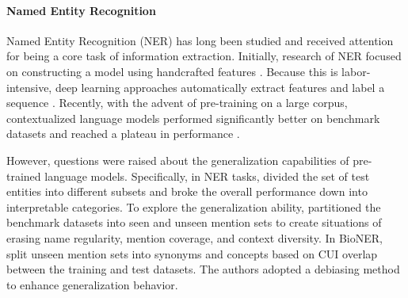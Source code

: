 \documentclass[11pt]{article}
\begin{document}
\paragraph{Named Entity Recognition} Named Entity Recognition (NER) has long been studied and received attention for being a core task of information extraction.
Initially, research of NER focused on constructing a model using handcrafted features \cite{zhou2002named,bender2003maximum,settles2004biomedical}.
Because this is labor-intensive, deep learning approaches automatically extract features and label a sequence \cite{dos2015boosting,lample2016neural,habibi2017deep}.
Recently, with the advent of pre-training on a large corpus, contextualized language models performed significantly better on benchmark datasets and reached a plateau in performance \cite{devlin2019bert,liu2019roberta,beltagy2019scibert,lee2020biobert}.

However, questions were raised about the generalization capabilities of pre-trained language models.
Specifically, in NER tasks, \citet{fu2020rethinking} divided the set of test entities into different subsets and broke the overall performance down into interpretable categories. 
To explore the generalization ability, \citet{lin2020rigourous} partitioned the benchmark datasets into seen and unseen mention sets to create situations of erasing name regularity, mention coverage, and context diversity.
In BioNER, \citet{kim2021your} split unseen mention sets into synonyms and concepts based on CUI overlap between the training and test datasets. 
The authors adopted a debiasing method to enhance generalization behavior.
\end{document}

